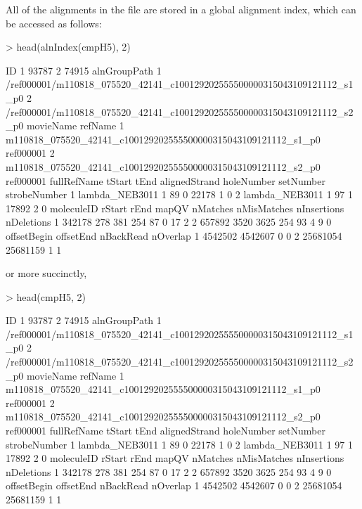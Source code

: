 \documentclass[letterpaper,12pt]{article}
\begin{document}
All of the alignments in the file are stored in a global alignment
index, which can be accessed as follows:
\begin{Schunk}
\begin{Sinput}
> head(alnIndex(cmpH5), 2)
\end{Sinput}
\begin{Soutput}
     ID
1 93787
2 74915
                                                              alnGroupPath
1 /ref000001/m110818_075520_42141_c100129202555500000315043109121112_s1_p0
2 /ref000001/m110818_075520_42141_c100129202555500000315043109121112_s2_p0
                                                      movieName   refName
1 m110818_075520_42141_c100129202555500000315043109121112_s1_p0 ref000001
2 m110818_075520_42141_c100129202555500000315043109121112_s2_p0 ref000001
     fullRefName tStart tEnd alignedStrand holeNumber setNumber strobeNumber
1 lambda_NEB3011      1   89             0      22178         1            0
2 lambda_NEB3011      1   97             1      17892         2            0
  moleculeID rStart rEnd mapQV nMatches nMisMatches nInsertions nDeletions
1     342178    278  381   254       87           0          17          2
2     657892   3520 3625   254       93           4           9          0
  offsetBegin offsetEnd nBackRead nOverlap
1     4542502   4542607         0        0
2    25681054  25681159         1        1
\end{Soutput}
\end{Schunk}
or more succinctly, 
\begin{Schunk}
\begin{Sinput}
> head(cmpH5, 2)
\end{Sinput}
\begin{Soutput}
     ID
1 93787
2 74915
                                                              alnGroupPath
1 /ref000001/m110818_075520_42141_c100129202555500000315043109121112_s1_p0
2 /ref000001/m110818_075520_42141_c100129202555500000315043109121112_s2_p0
                                                      movieName   refName
1 m110818_075520_42141_c100129202555500000315043109121112_s1_p0 ref000001
2 m110818_075520_42141_c100129202555500000315043109121112_s2_p0 ref000001
     fullRefName tStart tEnd alignedStrand holeNumber setNumber strobeNumber
1 lambda_NEB3011      1   89             0      22178         1            0
2 lambda_NEB3011      1   97             1      17892         2            0
  moleculeID rStart rEnd mapQV nMatches nMisMatches nInsertions nDeletions
1     342178    278  381   254       87           0          17          2
2     657892   3520 3625   254       93           4           9          0
  offsetBegin offsetEnd nBackRead nOverlap
1     4542502   4542607         0        0
2    25681054  25681159         1        1
\end{Soutput}
\end{Schunk}
\end{document}
